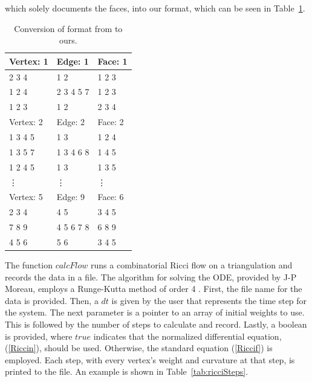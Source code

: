\documentclass[12pt]{article}
\begin{document}
\noindent which solely documents the faces, into our format, which can be seen in Table~\ref{tab:format}.\newline

\begin{table}
\begin{center}
\begin{tabular}{|l|l|l|}
\hline
 Vertex: 1 &    Edge: 1 &    Face: 1 \\ \hline 

     2 3 4 &        1 2 &     1 2 3  \\

    1 2 4  & 2 3 4 5 7  &     1 2 3  \\

    1 2 3  &       1 2  &     2 3 4  \\ \hline 

 Vertex: 2 &    Edge: 2 &    Face: 2 \\ \hline

   1 3 4 5 &        1 3 &     1 2 4  \\

  1 3 5 7  & 1 3 4 6 8  &     1 4 5  \\

  1 2 4 5  &       1 3  &     1 3 5  \\ \hline 

 			\vdots & \vdots & \vdots \\ \hline 

 Vertex: 5 &    Edge: 9 &    Face: 6 \\ \hline

     2 3 4 &        4 5 &     3 4 5  \\

    7 8 9  & 4 5 6 7 8  &     6 8 9  \\

     4 5 6 &       5 6  &     3 4 5  \\
\hline
\end{tabular}
\end{center}
\caption{Conversion of format from \cite{lutzmanifold} to ours.}
\label{tab:format}
\end{table}  

\noindent The function $calcFlow$ runs a combinatorial Ricci flow on a triangulation and records the data in a file. The algorithm for solving the ODE, provided by J-P Moreau, employs a Runge-Kutta method of order 4 \cite{JPM}. First, the file name for the data is provided. Then, a $dt$ is given by the user that represents the time step for the system. The next parameter is a pointer to an array of initial weights to use. This is followed by the number of steps to calculate and record. Lastly, a boolean is provided, where $true$ indicates that the normalized differential equation, (\ref{Riccin}), should be used. Otherwise, the standard equation (\ref{Riccif}) is employed. Each step, with every vertex's weight and curvature at that step, is printed to the file. An example is shown in Table~\ref{tab:ricciSteps}.\newline
\end{document}
